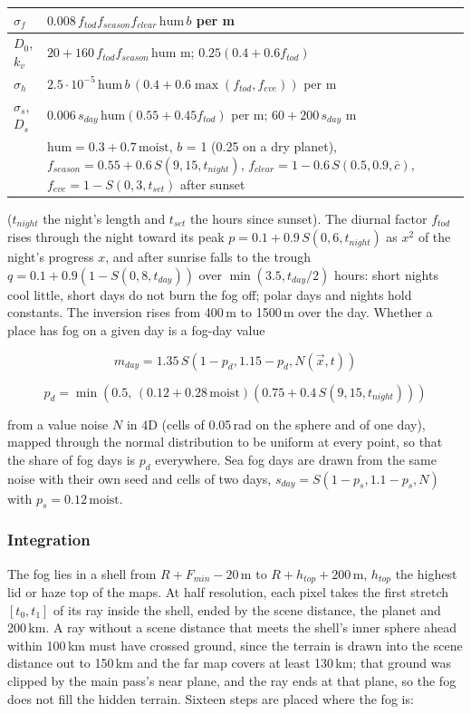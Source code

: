 \documentclass[Orbiter Technical Reference.tex]{subfiles}
\begin{document}
\begin{sloppypar}
\begin{longtable}{ |p{}|p{}| }
\hline\rule{0pt}{2ex}
$\sigma_{f}$ & $0.008\,f_{tod}f_{season}f_{clear}\,\mathrm{hum}\,b$ per m\\
\hline\rule{0pt}{2ex}
$D_{0}$, $k_{v}$ & $20 + 160\,f_{tod}f_{season}\,\mathrm{hum}$ m; $0.25(0.4 + 0.6f_{tod})$\\
\hline\rule{0pt}{2ex}
$\sigma_{h}$ & $2.5\cdot10^{-5}\,\mathrm{hum}\,b\,(0.4 + 0.6\max(f_{tod}, f_{eve}))$ per m\\
\hline\rule{0pt}{2ex}
$\sigma_{s}$, $D_{s}$ & $0.006\,s_{day}\,\mathrm{hum}(0.55 + 0.45f_{tod})$ per m; $60 + 200\,s_{day}$ m\\
\hline\rule{0pt}{2ex}
& $\mathrm{hum} = 0.3 + 0.7\,\mathrm{moist}$, $b$ = 1 (0.25 on a dry planet), $f_{season} = 0.55 + 0.6\,S(9, 15, t_{night})$, $f_{clear} = 1 - 0.6\,S(0.5, 0.9, \bar{c})$, $f_{eve} = 1 - S(0, 3, t_{set})$ after sunset\\
\hline
\end{longtable}

\noindent
($t_{night}$ the night's length and $t_{set}$ the hours since sunset). The diurnal factor $f_{tod}$ rises through the night toward its peak $p = 0.1 + 0.9\,S(0, 6, t_{night})$ as $x^{2}$ of the night's progress $x$, and after sunrise falls to the trough $q = 0.1 + 0.9(1 - S(0, 8, t_{day}))$ over $\min(3.5, t_{day}/2)$ hours: short nights cool little, short days do not burn the fog off; polar days and nights hold constants. The inversion rises from 400\,m to 1500\,m over the day. Whether a place has fog on a given day is a fog-day value

\[ m_{day} = 1.35\,S(1 - p_{d}, 1.15 - p_{d}, N(\vec{x}, t)) \]

\[ p_{d} = \min\left(0.5,\, (0.12 + 0.28\,\mathrm{moist})(0.75 + 0.4\,S(9, 15, t_{night}))\right) \]

\noindent
from a value noise $N$ in 4D (cells of 0.05\,rad on the sphere and of one day), mapped through the normal distribution to be uniform at every point, so that the share of fog days is $p_{d}$ everywhere. Sea fog days are drawn from the same noise with their own seed and cells of two days, $s_{day} = S(1 - p_{s}, 1.1 - p_{s}, N)$ with $p_{s} = 0.12\,\mathrm{moist}$.


\subsubsection{Integration}
The fog lies in a shell from $R + F_{min} - 20$\,m to $R + h_{top} + 200$\,m, $h_{top}$ the highest lid or haze top of the maps. At half resolution, each pixel takes the first stretch $[t_{0}, t_{1}]$ of its ray inside the shell, ended by the scene distance, the planet and 200\,km. A ray without a scene distance that meets the shell's inner sphere ahead within 100\,km must have crossed ground, since the terrain is drawn into the scene distance out to 150\,km and the far map covers at least 130\,km; that ground was clipped by the main pass's near plane, and the ray ends at that plane, so the fog does not fill the hidden terrain. Sixteen steps are placed where the fog is:


\end{sloppypar}
\end{document}
